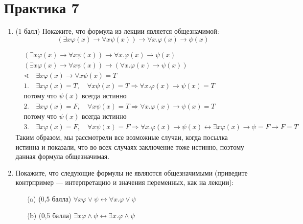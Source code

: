 \section{Практика 7}
\begin{enumerate}
    \item (1 балл) Покажите, что формула из лекции является общезначимой:
    $$(\exists x\varphi(x) \rightarrow \forall x\psi(x)) \rightarrow \forall x. \varphi(x) \rightarrow \psi(x)$$
    \begin{solution}
        \begin{align*}
            &(\exists x\varphi(x) \rightarrow \forall x\psi(x)) \rightarrow \forall x. \varphi(x) \rightarrow \psi(x) \\
            &(\exists x\varphi(x) \rightarrow \forall x\psi(x)) \rightarrow (\forall x. \varphi(x) \rightarrow \psi(x)) \\
            &\sphericalangle\quad \exists x\varphi(x) \rightarrow \forall x\psi(x) = T \\
            &1.\quad \exists x\varphi(x) = T, \quad \forall x\psi(x) = T \Rightarrow  \forall x. \varphi(x) \rightarrow \psi(x) = T \\
            &\text{потому что } \psi(x) \text{ всегда истинно} \\
            &2.\quad \exists x\varphi(x) = F, \quad \forall x\psi(x) = T \Rightarrow  \forall x. \varphi(x) \rightarrow \psi(x) = T \\
            &\text{потому что } \psi(x) \text{ всегда истинно} \\
            &3.\quad \exists x\varphi(x) = F, \quad \forall x\psi(x) = F \Rightarrow  \forall x. \varphi(x) \rightarrow \psi(x) \leftrightarrow \exists x \varphi(x) \rightarrow \psi = F \rightarrow F = T
        \end{align*}
        Таким образом, мы рассмотрели все возможные случаи, когда посылка истинна и показали, что во всех случаях заключение тоже истинно, поэтому данная формула общезначимая.
    \end{solution}
    \item Покажите, что следующие формулы не являются общезначимыми (приведите контрпример — интерпретацию и значения переменных, как на лекции):
    \begin{itemize}
        \item[(a)] (0,5 балла) $\forall x\varphi \lor \psi \leftrightarrow \forall x. \varphi \lor \psi$
        \item[(b)] (0,5 балла) $\exists x\varphi \land \psi \leftrightarrow \exists x. \varphi \land \psi$

\end{itemize}
\end{enumerate}
